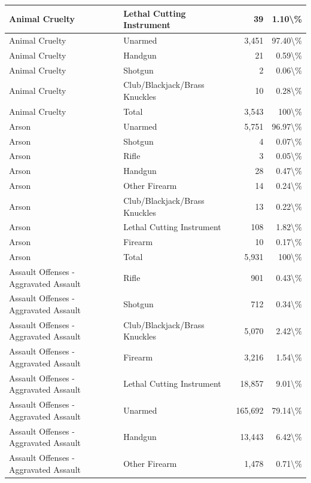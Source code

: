 \documentclass[
]{krantz}
\begin{document}
\begin{longtable}[t]{l|l|r|r}
\hline
Animal Cruelty & Lethal Cutting Instrument & 39 & 1.10\textbackslash{}\%\\
\hline
Animal Cruelty & Unarmed & 3,451 & 97.40\textbackslash{}\%\\
\hline
Animal Cruelty & Handgun & 21 & 0.59\textbackslash{}\%\\
\hline
Animal Cruelty & Shotgun & 2 & 0.06\textbackslash{}\%\\
\hline
Animal Cruelty & Club/Blackjack/Brass Knuckles & 10 & 0.28\textbackslash{}\%\\
\hline
Animal Cruelty & Total & 3,543 & 100\textbackslash{}\%\\
\hline
Arson & Unarmed & 5,751 & 96.97\textbackslash{}\%\\
\hline
Arson & Shotgun & 4 & 0.07\textbackslash{}\%\\
\hline
Arson & Rifle & 3 & 0.05\textbackslash{}\%\\
\hline
Arson & Handgun & 28 & 0.47\textbackslash{}\%\\
\hline
Arson & Other Firearm & 14 & 0.24\textbackslash{}\%\\
\hline
Arson & Club/Blackjack/Brass Knuckles & 13 & 0.22\textbackslash{}\%\\
\hline
Arson & Lethal Cutting Instrument & 108 & 1.82\textbackslash{}\%\\
\hline
Arson & Firearm & 10 & 0.17\textbackslash{}\%\\
\hline
Arson & Total & 5,931 & 100\textbackslash{}\%\\
\hline
Assault Offenses - Aggravated Assault & Rifle & 901 & 0.43\textbackslash{}\%\\
\hline
Assault Offenses - Aggravated Assault & Shotgun & 712 & 0.34\textbackslash{}\%\\
\hline
Assault Offenses - Aggravated Assault & Club/Blackjack/Brass Knuckles & 5,070 & 2.42\textbackslash{}\%\\
\hline
Assault Offenses - Aggravated Assault & Firearm & 3,216 & 1.54\textbackslash{}\%\\
\hline
Assault Offenses - Aggravated Assault & Lethal Cutting Instrument & 18,857 & 9.01\textbackslash{}\%\\
\hline
Assault Offenses - Aggravated Assault & Unarmed & 165,692 & 79.14\textbackslash{}\%\\
\hline
Assault Offenses - Aggravated Assault & Handgun & 13,443 & 6.42\textbackslash{}\%\\
\hline
Assault Offenses - Aggravated Assault & Other Firearm & 1,478 & 0.71\textbackslash{}\%\\

\end{longtable}
\end{document}
